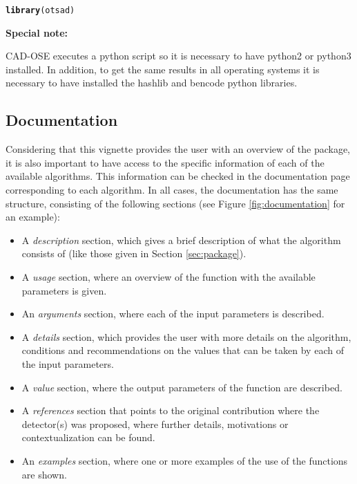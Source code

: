 \documentclass[a4paper]{article}\usepackage[]{graphicx}\usepackage[]{color}
\makeatletter
\newcommand{\hlstd}[1]{\textcolor[rgb]{0.345,0.345,0.345}{#1}}%
\newcommand{\hlkwd}[1]{\textcolor[rgb]{0.737,0.353,0.396}{\textbf{#1}}}%
\newenvironment{kframe}{%
 \def\at@end@of@kframe{}%
 \ifinner\ifhmode%
  \def\at@end@of@kframe{\end{minipage}}%
  \begin{minipage}{\columnwidth}%
 \fi\fi%
 \def\FrameCommand##1{\hskip\@totalleftmargin \hskip-\fboxsep
 \colorbox{shadecolor}{##1}\hskip-\fboxsep
     \hskip-\linewidth \hskip-\@totalleftmargin \hskip\columnwidth}%
 \MakeFramed {\advance\hsize-\width
   \@totalleftmargin\z@ \linewidth\hsize
   \@setminipage}}%
 {\par\unskip\endMakeFramed%
 \at@end@of@kframe}
\newenvironment{knitrout}{}{} %
\makeatother
\begin{document}
\begin{knitrout}
\color{fgcolor}\begin{kframe}
\begin{alltt}
\hlkwd{library}\hlstd{(otsad)}
\end{alltt}
\end{kframe}
\end{knitrout}

\textbf{Special note: }

CAD-OSE executes a python script so it is necessary to have python2 or python3 installed. In addition, to get the same results in all operating systems it is necessary to have installed the hashlib and bencode python libraries.

\subsection{Documentation}\label{sec:documentation}

Considering that this vignette provides the user with an overview of the  package, it is also important to have access to the specific information of each of the available algorithms. This information can be checked in the documentation page corresponding to each algorithm. In all cases, the documentation has the same structure, consisting of the following sections (see Figure \ref{fig:documentation} for an example):

\begin{itemize}
\item A \emph{description} section, which gives a brief description of what the algorithm consists of (like those given in Section \ref{sec:package}).
\item A \emph{usage} section, where an overview of the function with the available parameters is given.
\item An \emph{arguments} section, where each of the input parameters is described.
\item A \emph{details} section, which provides the user with more details on the algorithm, conditions and recommendations on the values that can be taken by each of the input parameters.
\item A \emph{value} section, where the output parameters of the function are described.
\item A \emph{references} section that points to the original contribution where the detector(s) was proposed, where further details, motivations or contextualization can be found.
\item An \emph{examples} section, where one or more examples of the use of the functions are shown.
\end{itemize}
\end{document}

